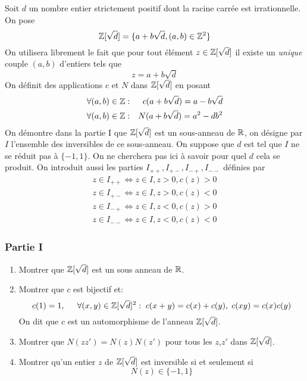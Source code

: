 Soit $d$ un nombre entier strictement positif dont la racine carrée est irrationnelle. On pose
$$\mathbb{Z}[\sqrt d ]=\{a+b\sqrt d,(a,b)\in\mathbb{Z}^2\}$$
On utilisera librement le fait que pour tout élément $z\in\mathbb{Z}[\sqrt d ]$ il existe un \emph{unique} couple $(a,b)$ d'entiers tels que $$z=a+b\sqrt d$$
On définit des applications $c$ et $N$ dans $ \mathbb{Z}[\sqrt d ]$ en posant
\begin{eqnarray*}
\forall (a,b) \in \mathbb{Z}&:&c(a+b\sqrt d)= a-b\sqrt d\\
\forall (a,b) \in \mathbb{Z}&:&N(a+b\sqrt d)=a^2-db^2
\end{eqnarray*}
On démontre dans la partie I que $\mathbb{Z}[\sqrt d ]$ est un sous-anneau de $\mathbb{R}$, on désigne par $I$ l'ensemble des inversibles de ce sous-anneau.\newline
On suppose que $d$ est tel que $I$ ne se réduit pas à $\{-1,1\}$. On ne cherchera pas ici à savoir pour quel $d$ cela se produit.\newline
On introduit aussi les parties $I_{++}, I_{+-}, I_{-+}, I_{--}$ définies par
\begin{eqnarray*}
z\in I_{++} \Leftrightarrow z\in I,z>0,c(z)>0\\
z\in I_{+-} \Leftrightarrow z\in I,z>0,c(z)<0\\
z\in I_{-+} \Leftrightarrow z\in I,z<0,c(z)>0\\
z\in I_{--} \Leftrightarrow z\in I,z<0,c(z)<0
\end{eqnarray*}

\subsubsection*{Partie I}
\begin{enumerate}
\item Montrer que $ \mathbb{Z}[\sqrt d ]$ est un sous anneau de $\mathbb{R}$.
\item Montrer que $c$ est bijectif et:
\begin{displaymath}
 c(1)=1,\hspace{0.5cm} \forall (x,y)\in \mathbb{Z}[\sqrt d ]^2:\; c(x+y)=c(x)+c(y),\; c(xy)=c(x)c(y)
\end{displaymath}
On dit que $c$ est un automorphisme de l'anneau $\mathbb{Z}[\sqrt d ]$.
\item Montrer que $N(zz')=N(z)N(z')$ pour tous les $z$,$z'$ dans $\mathbb{Z}[\sqrt d ]$.

\item Montrer qu'un entier $z$ de $\mathbb{Z}[\sqrt d ]$ est inversible si et seulement si $$N(z)\in \{-1,1\}$$
\end{enumerate}

